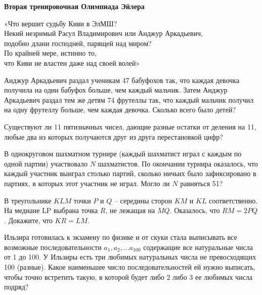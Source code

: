 \hspace{3mm}

\centerline{\bf \Huge Вторая тренировочная Олимпиада Эйлера}

\hspace{3mm}

 \begin{flushright}
     \scriptsize{«Что вершит судьбу Киви в ЭлМШ?\\ Некий незримый Расул Владимирович или Анджур Аркадьевич,\\ подобно длани господней, парящей над миром? \\По крайней мере, истинно то, \\что Киви не властен даже над своей волей»}
 \end{flushright}
 
 Анджур Аркадьевич раздал ученикам 47 бабуфохов так, что каждая девочка получила на один бабуфох больше, чем каждый мальчик. Затем Анджур Аркадьевич раздал тем же детям 74 фрутеллы так, что каждый мальчик получил на одну фрутеллу больше, чем каждая девочка. Сколько всего было детей?

\hspace{3mm}

Существуют ли 11 пятизначных чисел, дающие разные остатки от деления на 11, любые два из которых получаются друг из друга перестановкой цифр?

\hspace{3mm}

В однокруговом шахматном турнире (каждый шахматист играл с каждым по одной партии) участвовало $N$ шахматистов. По окончании турнира оказалось, что каждый участник выиграл столько партий, сколько ничьих было зафиксировано в партиях, в которых этот участник не играл. Могло ли $N$ равняться 51?

\hspace{3mm}

В треугольнике $KLM$ точки $P$ и $Q$ – середины сторон $KM$ и $KL$ соответственно. На медиане LP выбрана точка $R$, не лежащая на $MQ$. Оказалось, что $RM = 2PQ$. Докажите, что $KR = LM$.

\hspace{3mm}

 Ильзира готовилась к экзамену по физике и от скуки стала выписывать все возможные последовательности ${a_1, a_2, \dotsc a_{100}}$ содержащие все натуральные числа от 1 до 100. У Ильзиры есть три любимых натуральных числа не превосходящих 100 (разные). Какое наименьшее число последовательностей ей нужно выписать, чтобы точно встретить такую, в которой будет либо 2 либо 3 ее любимых числа подряд?